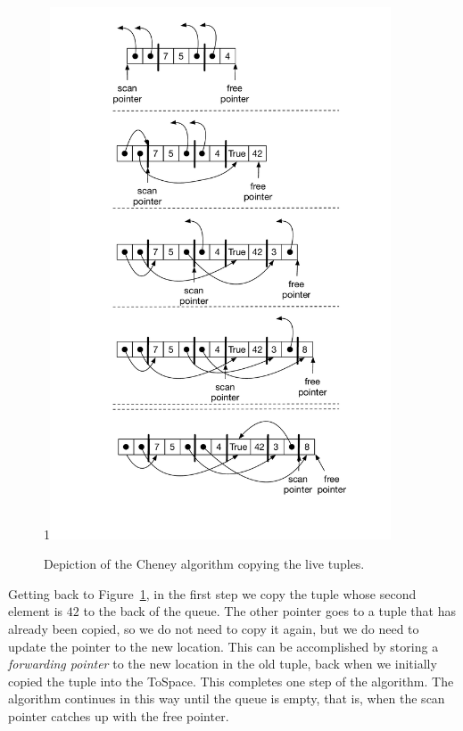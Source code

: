 \documentclass[7x10,nocrop]{TimesAPriori_MIT}%
\def\pythonEd{1}
\def\edition{1}
\newcommand{\python}[1]{{\if\edition\pythonEd #1\fi}}
\begin{document}
\begin{figure}[tbp]
\python{\includegraphics[width=0.9\textwidth]{figs/cheney-python}}
\caption{Depiction of the Cheney algorithm copying the live tuples.}
\label{fig:cheney}
\end{figure}

Getting back to Figure~\ref{fig:cheney}, in the first step we copy the
tuple whose second element is $42$ to the back of the queue. The other
pointer goes to a tuple that has already been copied, so we do not
need to copy it again, but we do need to update the pointer to the new
location. This can be accomplished by storing a \emph{forwarding
pointer} to the new location in the
old tuple, back when we initially copied the tuple into the
ToSpace. This completes one step of the algorithm. The algorithm
continues in this way until the queue is empty, that is, when the scan
pointer catches up with the free pointer.
\end{document}
